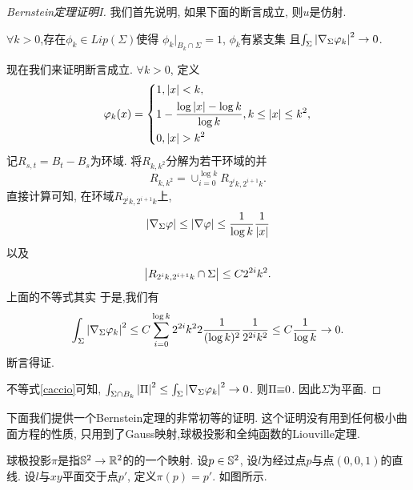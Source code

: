 \begin{proof}[Bernstein定理证明I]
    我们首先说明, 如果下面的断言成立, 则$u$是仿射.
    \begin{claim}
        $\forall k >0$,存在$\phi_k \in Lip(\Sigma)$使得  $\phi_k|_{B_k \cap \Sigma}=1$, $\phi_k$有紧支集 且$ \int_\Sigma \abs{\nabla_\Sigma \phi_k}^2 \to 0$.
        \begin{subproof}
            现在我们来证明断言成立. $\forall k>0$, 定义
            \begin{equation}
                \phi_k(x)=\left\{
                    \begin{aligned}
                        &1, \abs{x} < k, \\
                        &1-\frac{\log\abs{x}-\log k}{\log k}, k \le \abs{x} \le k^2,\\
                        &0, \abs{x} > k^2
                    \end{aligned}
                \right.
            \end{equation}
            记$R_{s,t}=B_t-B_s$为环域. 将$R_{k,k^2}$分解为若干环域的并 
            \begin{equation}
                R_{k,k^2}=\cup_{i=0}^{\log k} R_{2^ik,2^{i+1}k}.
            \end{equation}
            直接计算可知, 在环域$R_{2^ik,2^{i+1}k}$上,
            \begin{equation}
                \abs{\nabla_\Sigma \phi} \le \abs{\nabla \phi} \le \frac{1}{\log k} \frac{1}{\abs{x}}
            \end{equation}
            以及
            \begin{equation} \label{logp}
                \abs{R_{2^ik,2^{i+1}k} \cap \Sigma } \le C 2^{2i}k^2. 
            \end{equation}
            上面的不等式其实
            于是,我们有
            \begin{equation}
                \int_\Sigma \abs{\nabla_\Sigma \phi_k}^2 \le C\sum_{i=0}^{\log k} 2^{2i}k^22\frac{1}{(\log k)^2} \frac{1}{2^{2i}k^2} \le C\frac{1}{\log k} \to 0.
            \end{equation}
            断言得证.
        \end{subproof}
    \end{claim}
    不等式\eqref{caccio}可知, $\int_{\Sigma\cap B_k} \abs{\II}^2 \le \int_\Sigma \abs{\nabla_\Sigma \phi_k}^2 \to 0$. 则$\II\eq 0$. 因此$\Sigma$为平面. 
\end{proof}
下面我们提供一个Bernstein定理的非常初等的证明. 这个证明没有用到任何极小曲面方程的性质, 只用到了Gauss映射,球极投影和全纯函数的Liouville定理.
\begin{definition} \label{stereo}
    球极投影$\pi$是指$\S^2 \to \R^2$的的一个映射. 设$p \in \S^2$, 设$l$为经过点$p$与点$(0,0,1)$的直线. 设$l$与$xy$平面交于点$p'$, 定义$\pi(p)=p'$. 如图所示.
\end{definition}

